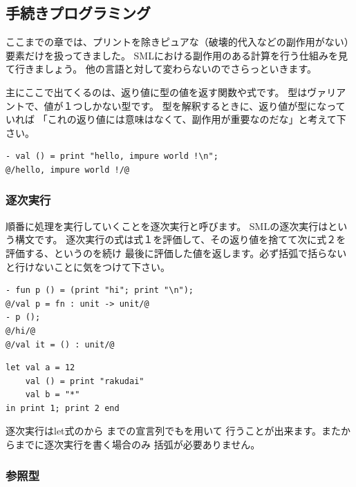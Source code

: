 \documentclass[11pt,a4paper]{jarticle}
\begin{document}
\subsection{手続きプログラミング}

ここまでの章では、プリントを除きピュアな（破壊的代入などの副作用がない）要素だけを扱ってきました。
SMLにおける副作用のある計算を行う仕組みを見て行きましょう。
他の言語と対して変わらないのでさらっといきます。

主にここで出てくるのは、返り値に型の値を返す関数や式です。
型はヴァリアントで、値が\prog{()}１つしかない型です。
型を解釈するときに、返り値が型になっていれば
「これの返り値には意味はなくて、副作用が重要なのだな」と考えて下さい。

\begin{lstlisting}
- val () = print "hello, impure world !\n";
@/hello, impure world !/@
\end{lstlisting}

\subsubsection{逐次実行}

順番に処理を実行していくことを逐次実行と呼びます。
SMLの逐次実行はという構文です。
逐次実行の式は式１を評価して、その返り値を捨てて次に式２を評価する、というのを続け
最後に評価した値を返します。必ず括弧で括らないと行けないことに気をつけて下さい。

\begin{minipage}[htb]{0.5\textwidth}
\begin{lstlisting}[caption=逐次実行1,label=code:sequence]
- fun p () = (print "hi"; print "\n");
@/val p = fn : unit -> unit/@
- p ();
@/hi/@
@/val it = () : unit/@
\end{lstlisting}
\end{minipage}
  \hfill
\begin{minipage}[htb]{0.5\textwidth}
\begin{lstlisting}[caption=逐次実行2]
let val a = 12
    val () = print "rakudai"
    val b = "*"
in print 1; print 2 end
\end{lstlisting}
\end{minipage}
逐次実行はlet式のから
までの宣言列でもを用いて
行うことが出来ます。またからまでに逐次実行を書く場合のみ
括弧が必要ありません。

\subsubsection{参照型}
\end{document}
